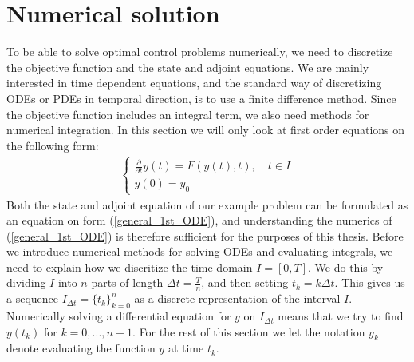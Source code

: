 \section{Numerical solution}
To be able to solve optimal control problems numerically, we need to discretize the objective function and the state and adjoint equations. We are mainly interested in time dependent equations, and the standard way of discretizing ODEs or PDEs in temporal direction, is to use a finite difference method. Since the objective function includes an integral term, we also need methods for numerical integration. In this section we will only look at first order equations on the following form:
\begin{align}
\left\{
     \begin{array}{lr}
	\frac{\partial}{\partial t} y(t) = F(y(t),t),\quad t\in I \\
	y(0)=y_0 
	\end{array}
\right.\label{general_1st_ODE}
\end{align}
Both the state and adjoint equation of our example problem can be formulated as an equation on form (\ref{general_1st_ODE}), and understanding the numerics of (\ref{general_1st_ODE}) is therefore sufficient for the purposes of this thesis. Before we introduce numerical methods for solving ODEs and evaluating integrals, we need to explain how we discritize the time domain $I=[0,T]$. We do this by dividing $I$ into $n$ parts of length $\Delta t=\frac{T}{n}$, and then setting $t_k=k\Delta t$. This gives us a sequence $I_{\Delta t}=\{t_k\}_{k=0}^{n}$ as a discrete representation of the interval $I$. Numerically solving a differential equation for $y$ on $I_{\Delta t}$ means that we try to find $y(t_k)$ for $k=0,...,n+1$. For the rest of this section we let the notation $y_k$ denote evaluating the function $y$ at time $t_k$.
